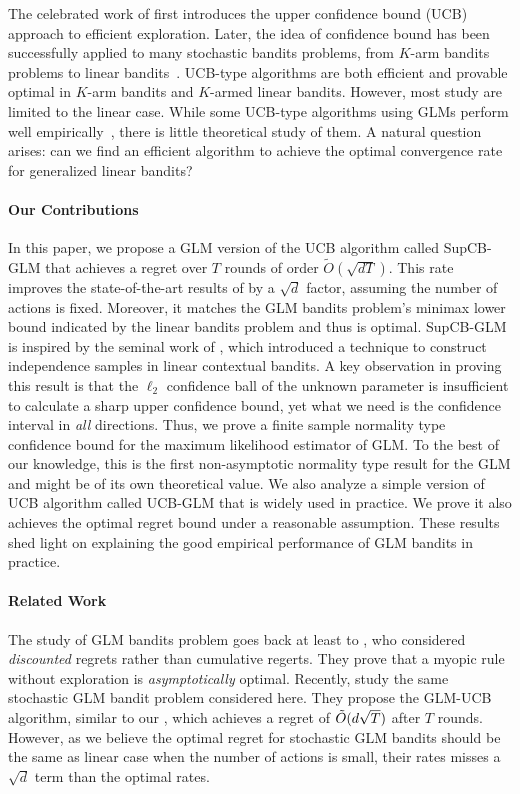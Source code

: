 The celebrated work of \citet{lai1985asymptotically} first introduces the upper confidence bound (UCB) approach to efficient exploration. Later, the idea of confidence bound has been successfully applied to many stochastic bandits problems, from $K$-arm bandits problems \cite{auer2002finite, bubeck2012regret} to linear bandits~\cite{auer2003using,abbasi2011improved}. UCB-type algorithms are both efficient and provable optimal in $K$-arm bandits and $K$-armed linear bandits. However, most study are limited to the linear case. While some UCB-type algorithms using GLMs perform well empirically~\cite{liunbiased}, there is little theoretical study of them. A natural question arises: can we find an efficient algorithm to achieve the optimal convergence rate for generalized linear bandits?

\paragraph{Our Contributions} In this paper, we propose a GLM version of the UCB algorithm called SupCB-GLM that achieves a regret over $T$ rounds of order $\tilde{O}(\sqrt{dT})$. This rate improves the state-of-the-art results of \citet{filippi2010parametric} by a $\sqrt{d}$ factor, assuming the number of actions is fixed.  Moreover, it matches the GLM bandits problem's minimax lower bound indicated by the linear bandits problem and thus is optimal. SupCB-GLM  is inspired by the seminal work of \citet{auer2003using}, which introduced a technique to construct independence samples in linear contextual bandits.  A key observation in proving this result is that the $\ell_2$ confidence ball of the unknown parameter is insufficient to calculate a sharp upper confidence bound, yet what we need is the confidence interval in \emph{all} directions. Thus, we prove a finite sample normality type confidence bound for the maximum likelihood estimator of GLM. To the best of our knowledge, this is the first non-asymptotic normality type result for the GLM and might be of its own theoretical value. We also analyze a simple version of UCB algorithm called UCB-GLM that is widely used in practice. We prove it also achieves the optimal regret bound under a reasonable assumption. These results shed light on explaining the good empirical performance of GLM bandits in practice. 

\paragraph{Related Work} The study of GLM bandits problem goes back at least to \citet{sarkar1991one},
who considered \emph{discounted} regrets rather than cumulative regerts. They prove that a myopic rule without exploration is \emph{asymptotically} optimal. Recently,  \citet{filippi2010parametric} study the same stochastic GLM bandit problem considered here. They propose the GLM-UCB algorithm, similar to our , which achieves a regret of ${\small \tilde{O}(d\sqrt{T})}$ after $T$ rounds. However, as we believe the optimal regret for stochastic GLM bandits should be the same as linear case when the number of actions is small, their rates misses a $\sqrt{d}$ term than the optimal rates.

